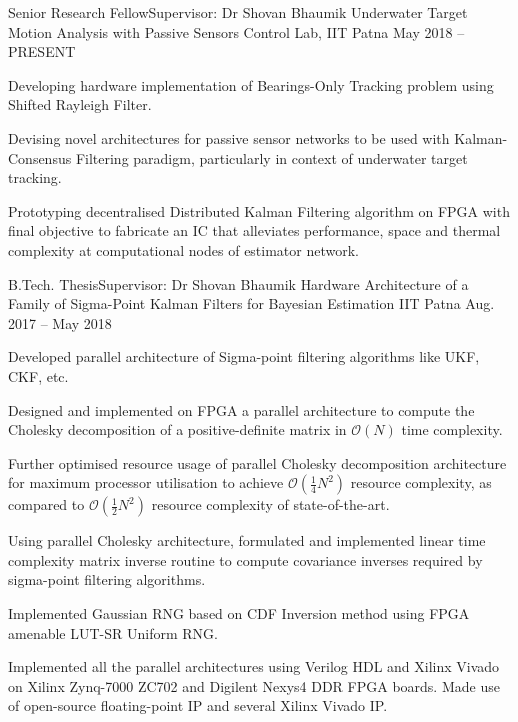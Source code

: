 
\begin{cventries}

\cventry
	{Senior Research Fellow\quad\textbar\quad Supervisor: Dr Shovan Bhaumik} %
	{Underwater Target Motion Analysis with Passive Sensors} %
	{Control Lab, IIT Patna} %
	{May 2018 -- PRESENT} %
	{\begin{cvitems} %
		\item {Developing hardware implementation of Bearings-Only Tracking problem using Shifted Rayleigh Filter.}
		\item {Devising novel architectures for passive sensor networks to be used with Kalman-Consensus Filtering paradigm, particularly in context of underwater target tracking.}
		\item {Prototyping decentralised Distributed Kalman Filtering algorithm on FPGA with final objective to fabricate an IC that alleviates performance, space and thermal complexity at computational nodes of estimator network.}
	\end{cvitems}}

\cventry
	{B.Tech. Thesis\quad\textbar\quad Supervisor: Dr Shovan Bhaumik} %
	{Hardware Architecture of a Family of Sigma-Point Kalman Filters for Bayesian Estimation} %
	{IIT Patna} %
	{Aug. 2017 -- May 2018} %
	{\begin{cvitems} %
		\item {Developed parallel architecture of Sigma-point filtering algorithms like UKF, CKF, etc.}
		\item {Designed and implemented on FPGA a parallel architecture to compute the Cholesky decomposition of a positive-definite matrix in $\mathcal{O} \left( N \right)$ time complexity.}
		\item {Further optimised resource usage of parallel Cholesky decomposition architecture for maximum processor utilisation to achieve $\mathcal{O} \left( \frac{1}{4} N^2 \right)$ resource complexity, as compared to $\mathcal{O} \left( \frac{1}{2} N^2 \right)$ resource complexity of state-of-the-art.}
		\item {Using parallel Cholesky architecture, formulated and implemented linear time complexity matrix inverse routine to compute covariance inverses required by sigma-point filtering algorithms.}
		\item {Implemented Gaussian RNG based on CDF Inversion method using FPGA amenable LUT-SR Uniform RNG.}
		\item {Implemented all the parallel architectures using Verilog HDL and Xilinx Vivado on Xilinx Zynq-7000 ZC702 and Digilent Nexys4 DDR FPGA boards. Made use of open-source floating-point IP and several Xilinx Vivado IP.}
	\end{cvitems}}

\end{cventries}
